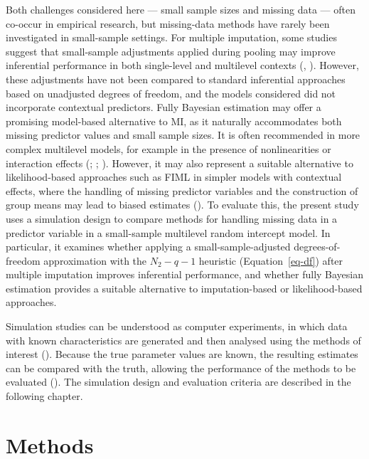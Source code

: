 \documentclass[
  letterpaper,
  11pt,
  english,
  singlespacing,
  headsepline,
  openany]{MastersDoctoralThesis}
\begin{document}
Both challenges considered here --- small sample sizes and missing data
--- often co-occur in empirical research, but missing-data methods have
rarely been investigated in small-sample settings. For multiple
imputation, some studies suggest that small-sample adjustments applied
during pooling may improve inferential performance in both single-level
and multilevel contexts (,
). However, these adjustments have not
been compared to standard inferential approaches based on unadjusted
degrees of freedom, and the models considered did not incorporate
contextual predictors. Fully Bayesian estimation may offer a promising
model-based alternative to MI, as it naturally accommodates both missing
predictor values and small sample sizes. It is often recommended in more
complex multilevel models, for example in the presence of nonlinearities
or interaction effects (; ;
). However, it may
also represent a suitable alternative to likelihood-based approaches
such as FIML in simpler models with contextual effects, where the
handling of missing predictor variables and the construction of group
means may lead to biased estimates (). To evaluate this, the present study uses a simulation
design to compare methods for handling missing data in a predictor
variable in a small-sample multilevel random intercept model. In
particular, it examines whether applying a small-sample-adjusted
degrees-of-freedom approximation with the \(N_2 - q - 1\) heuristic
(Equation~\ref{eq-df}) after multiple imputation improves inferential
performance, and whether fully Bayesian estimation provides a suitable
alternative to imputation-based or likelihood-based approaches.

Simulation studies can be understood as computer experiments, in which
data with known characteristics are generated and then analysed using
the methods of interest ().
Because the true parameter values are known, the resulting estimates can
be compared with the truth, allowing the performance of the methods to
be evaluated (). The simulation
design and evaluation criteria are described in the following chapter.


\chapter{Methods}\label{methods}
\end{document}
